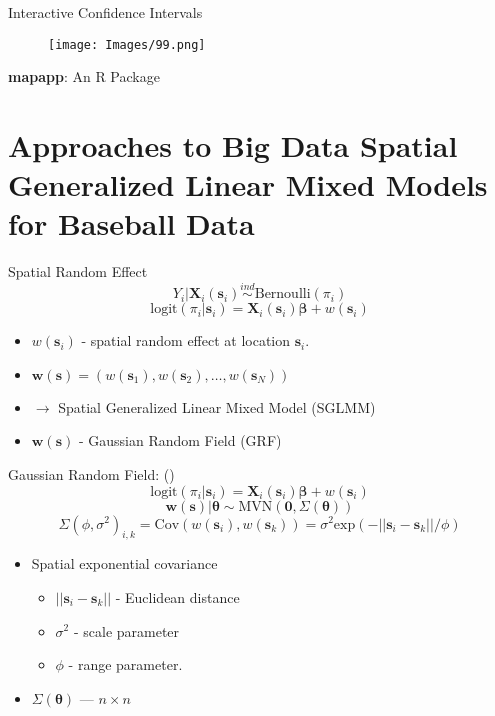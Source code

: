 \documentclass{beamer}
\begin{document}
\begin{frame}{Interactive Confidence Intervals}{} %
  \begin{figure}[H]
	\centering
	\texttt{[image: Images/99.png]}
	\end{figure}
{\bf mapapp}: An R Package
\end{frame}

\section{Approaches to Big Data Spatial Generalized Linear Mixed Models for Baseball Data}

\begin{frame}{Spatial Random Effect}{}
$$ Y_{i}|\mathbf{X}_{i}(\mathbf{s}_{i}) \stackrel{ind}{\sim} \mbox{Bernoulli}(\pi_{i}) $$
$$\text{logit}(\pi_{i}|\pmb{s}_{i}) = \mathbf{X}_{i}(\mathbf{s}_{i})\pmb{\beta} + w(\pmb{s}_{i}) $$
\begin{itemize}
\addtolength{\itemsep}{0.5\baselineskip}
\item $w(\pmb{s}_{i})$ - spatial random effect at location $\pmb{s}_{i}$.
\item $\pmb{w}(\pmb{s}) = (w(\pmb{s}_{1}), w(\pmb{s}_{2}), \dots, w(\pmb{s}_{N}))$  
\item $\rightarrow$ Spatial Generalized Linear Mixed Model (SGLMM)
\item $\pmb{w}(\pmb{s})$ - Gaussian Random Field (GRF)
\end{itemize}

\end{frame}

\begin{frame}{Gaussian Random Field: ()}{} %
$$\text{logit}(\pi_{i}|\pmb{s}_{i}) = \mathbf{X}_{i}(\mathbf{s}_{i})\pmb{\beta} + w(\pmb{s}_{i}) $$
$$\pmb{w}(\pmb{s}) | \pmb{\theta} \sim \text{MVN}(\pmb{0}, \Sigma(\pmb{\theta}))$$
$$\Sigma(\phi, \sigma^{2})_{i,k} = \text{Cov}(w(\pmb{s}_{i}), w(\pmb{s}_{k})) =  \sigma^{2} \text{exp}(-||\pmb{s}_{i} - \pmb{s}_{k}||/\phi)$$
\begin{itemize}
\addtolength{\itemsep}{0.5\baselineskip}
\item Spatial exponential covariance
  \begin{itemize}
  \addtolength{\itemsep}{0.5\baselineskip}
  \item $||\pmb{s}_{i} - \pmb{s}_{k}||$ - Euclidean distance
  \item $\sigma^{2}$ - scale parameter
  \item $\phi$ - range parameter.
  \end{itemize}
\item $\Sigma(\pmb{\theta})$ --- $n \times n$
\end{itemize}

\end{frame}
\end{document}
